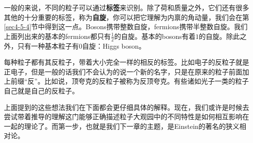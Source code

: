 一般的来说，不同的粒子可以通过{\bf 标签}来识别。除了荷和质量之外，它们还有很多其他的十分重要的标签，称为{\bf 自旋}，你可以把它理解为内禀的角动量，我们会在第\ref{sec4-5-4}节中得到这一点。Bosons携带整数自旋，fermions携带半整数自旋。我们上面列出来的基本的fermions都只有$\tfrac{1}{2}$的自旋。基本的bosons有着$1$的自旋。除此之外，只有一种基本粒子有$0$自旋：Higgs boson。

每种粒子都有其反粒子，带着大小完全一样的相反的标签。比如电子的反粒子就是正电子，但是一般的话我们不会认为的说一个新的名字，只是在原来的粒子前面加上前缀``反''。比如说，顶夸克的反粒子被称为反顶夸克。有些诸如光子一类的粒子自己就是自己的反粒子。

上面提到的这些想法我们在下面都会更仔细具体的解释。现在，我们或许是时候去尝试带着推导的理解这门能够正确描述粒子大观园中的不同特性是如何相互影响在一起的理论了。而第一步，也就是我们下一章的主题，是Einstein的著名的狭义相对论。



